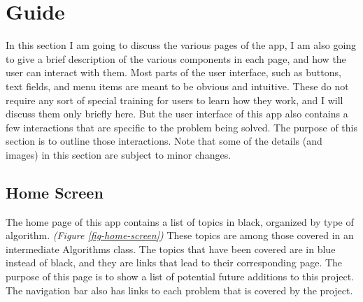 \chapter{Guide}
\label{guide}
In this section I am going to discuss the various pages of the app, 
I am also going to give a brief description of the various components in each page,
and how the user can interact with them.
Most parts of the user interface, such as buttons, text fields, and menu items are meant 
to be obvious and intuitive. 
These do not require any sort of special training for users to learn how they work,
and I will discuss them only briefly here. 
But the user interface of this app also contains a few interactions that are specific
to the problem being solved. The purpose of this section is to outline those interactions.
Note that some of the details (and images) in this section are subject to minor changes.
\section{Home Screen}
The home page of this app contains a list of topics in black, 
organized by type of algorithm. 
\textit{(Figure \ref{fig-home-screen})} 
These topics are among those covered in an intermediate Algorithms class. 
The topics that have been covered are in blue instead of black,
and they are links that lead to their corresponding page. 
The purpose of this page is to show a list of potential future additions 
to this project. 
The navigation bar also has links to each problem that is covered by the project. 
